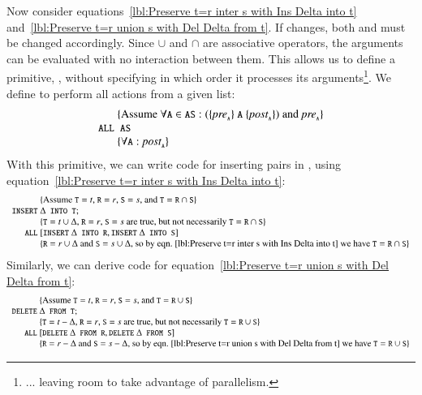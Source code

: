 \documentclass{elsarticle}
\begin{document}
	Now consider equations~\ref{lbl:Preserve t=r inter s with Ins Delta into t} and~\ref{lbl:Preserve t=r union s with Del Delta from t}.
	If  changes, both  and  must be changed accordingly.
	Since $\cup$ and $\cap$ are associative operators, the arguments can be evaluated with no interaction between them.
	This allows us to define a primitive, , without specifying in which order it processes its arguments\footnote{... leaving room to take advantage of parallelism.}.
	We define  to perform all actions from a given list:
\[\begin{array}{r@{~}l}
&\{\text{Assume }\forall\code{A}\in\code{AS}: (\{\id{pre}_{\code{\tiny A}}\}\ \code{A}\ \{\id{post}_{\code{\tiny A}}\})\text{ and } \id{pre}_{\code{\tiny A}} \}\\
\code{ALL}&\ \code{AS}\\
&\{\forall\code{A}: \id{post}_{\code{\tiny A}}\}
\end{array}\]
	With this primitive, we can write code for inserting pairs in ,
	using equation~\ref{lbl:Preserve t=r inter s with Ins Delta into t}:
\[\begin{array}{r@{~}l}
&\{\text{Assume $\code{T}=t$, $\code{R}=r$, $\code{S}=s$, and $\code{T}=\code{R}\cap\code{S}$}\}\\
\code{INSERT}&\Delta\code{ INTO T};\\
&\{\text{$\code{T}=t\cup\Delta$, $\code{R}=r$, $\code{S}=s$ are true, but not necessarily $\code{T}=\code{R}\cap\code{S}$}\}\\
\code{ALL}&[\code{INSERT}\ \Delta\code{ INTO R},\code{INSERT}\ \Delta\code{ INTO S}]\\
&\{\code{R}=r\cup\Delta\text{ and }\code{S}=s\cup\Delta\text{, so by eqn.~\ref{lbl:Preserve t=r inter s with Ins Delta into t} we have }\code{T}=\code{R}\cap\code{S}\}
\end{array}\]
	Similarly, we can derive code for equation~\ref{lbl:Preserve t=r union s with Del Delta from t}:
\[\begin{array}{r@{~}l}
&\{\text{Assume $\code{T}=t$, $\code{R}=r$, $\code{S}=s$, and $\code{T}=\code{R}\cup\code{S}$}\}\\
\code{DELETE}&\Delta\code{ FROM T};\\
&\{\text{$\code{T}=t-\Delta$, $\code{R}=r$, $\code{S}=s$ are true, but not necessarily $\code{T}=\code{R}\cup\code{S}$}\}\\
\code{ALL}&[\code{DELETE}\ \Delta\code{ FROM R},\code{DELETE}\ \Delta\code{ FROM S}]\\
&\{\code{R}=r-\Delta\text{ and }\code{S}=s-\Delta\text{, so by eqn.~\ref{lbl:Preserve t=r union s with Del Delta from t} we have }\code{T}=\code{R}\cup\code{S}\}
\end{array}\]
\end{document}

